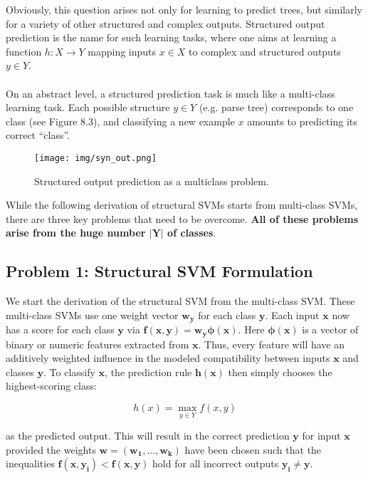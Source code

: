 \documentclass[twoside]{article}
\begin{document}
Obviously, this question arises not only for learning to
predict trees, but similarly for a variety of other structured
and complex outputs. Structured output prediction is the
name for such learning tasks, where one aims at learning
a function $h : X \rightarrow Y$ mapping inputs $x \in X$ to complex
and structured outputs $y \in Y$. 
\\ \\ On an abstract level, a structured prediction task is much like
a multi-class learning task. Each possible structure $y \in Y$
(e.g. parse tree) corresponds to one class (see Figure 8.3), and
classifying a new example $x$ amounts to predicting its correct
“class”. 

\begin{figure}[h]
\caption{Structured output prediction as a multiclass problem.}
\centering
\texttt{[image: img/syn\_out.png]}
\end{figure}

While the following derivation of structural SVMs
starts from multi-class SVMs, there are three key problems
that need to be overcome. \textbf{All of these problems arise from
the huge number $\mathbf{|Y|}$ of classes}. 
\newpage

\subsection{Problem 1: Structural SVM Formulation}
We start the derivation of the structural SVM from the multi-class SVM. These multi-class SVMs use one weight vector $\mathbf{w_{y}}$ for each class $\mathbf{y}$. Each input
$\mathbf{x}$ now has a score for each class $\mathbf{y}$ via $\mathbf{f(x,y) = w_{y} \phi(x)}$.
Here $\mathbf{\phi(x)}$ is a vector of binary or numeric features extracted
from $\mathbf{x}$. Thus, every feature will have an additively weighted
influence in the modeled compatibility between inputs $\mathbf{x}$ and
classes $\mathbf{y}$. To classify $\mathbf{x}$, the prediction rule $\mathbf{h(x)}$ then simply
chooses the highest-scoring class:

\begin{equation}
    h(x) = \max_{y \in Y} f(x,y)
\end{equation}

as the predicted output. This will result in the correct prediction $\mathbf{y}$ for input $\mathbf{x}$ provided the weights $\mathbf{w = (w_{1}, . . . , w_{k})}$
have been chosen such that the inequalities $\mathbf{f(x,y_{i}) < f(x, y)}$
hold for all incorrect outputs $\mathbf{y_{i} \not =  y}$. \\
\end{document}
